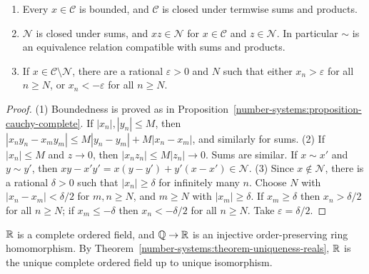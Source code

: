 \begin{lemma}\label{number-systems:lemma-cauchy-rationals}
\begin{enumerate}
\item Every $x \in \mathcal{C}$ is bounded, and $\mathcal{C}$ is closed under
termwise sums and products.
\item $\mathcal{N}$ is closed under sums, and $xz \in \mathcal{N}$ for
$x \in \mathcal{C}$ and $z \in \mathcal{N}$. In particular $\sim$ is an equivalence
relation compatible with sums and products.
\item If $x \in \mathcal{C} \setminus \mathcal{N}$, there are a rational
$\varepsilon > 0$ and $N$ such that either $x_n > \varepsilon$ for all $n \geq N$,
or $x_n < -\varepsilon$ for all $n \geq N$.
\end{enumerate}
\end{lemma}

\begin{proof}
(1) Boundedness is proved as in
Proposition~\ref{number-systems:proposition-cauchy-complete}. If $|x_n|, |y_n| \leq M$,
then $|x_ny_n - x_my_m| \leq M|y_n - y_m| + M|x_n - x_m|$, and similarly for sums.
(2) If $|x_n| \leq M$ and $z \to 0$, then $|x_n z_n| \leq M|z_n| \to 0$. Sums are
similar. If $x \sim x'$ and $y \sim y'$, then
$xy - x'y' = x(y - y') + y'(x - x') \in \mathcal{N}$.
(3) Since $x \notin \mathcal{N}$, there is a rational $\delta > 0$ such that
$|x_n| \geq \delta$ for infinitely many $n$. Choose $N$ with
$|x_n - x_m| < \delta/2$ for $m, n \geq N$, and $m \geq N$ with $|x_m| \geq \delta$.
If $x_m \geq \delta$ then $x_n > \delta/2$ for all $n \geq N$; if $x_m \leq -\delta$
then $x_n < -\delta/2$ for all $n \geq N$. Take $\varepsilon = \delta/2$.
\end{proof}

\begin{theorem}\label{number-systems:theorem-reals}
$\mathbb{R}$ is a complete ordered field, and $\mathbb{Q} \to \mathbb{R}$ is an injective
order-preserving ring homomorphism. By
Theorem~\ref{number-systems:theorem-uniqueness-reals}, $\mathbb{R}$ is the unique complete
ordered field up to unique isomorphism.
\end{theorem}

